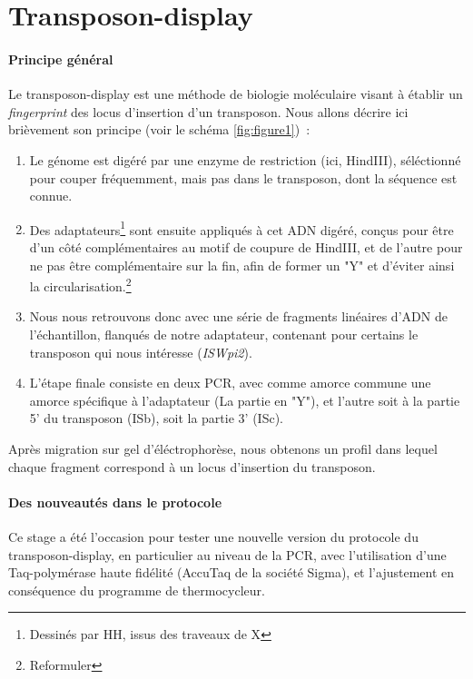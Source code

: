 \section{Transposon-display} %
\label{sec:transposon_display}

	\paragraph{Principe général} %
	\label{par:principe_TnDisp}
	Le transposon-display est une méthode de biologie moléculaire visant à établir un \textit{fingerprint} des locus d’insertion d’un transposon. Nous allons décrire ici brièvement son principe (voir le schéma \ref{fig:figure1})~:
	\begin{enumerate}
		\item Le génome est digéré par une enzyme de restriction (ici, HindIII), séléctionné pour couper fréquemment, mais pas dans le transposon, dont la séquence est connue.
		\item Des adaptateurs\footnote{Dessinés par HH, issus des traveaux de X} sont ensuite appliqués à cet ADN digéré, conçus pour être d’un côté complémentaires au motif de coupure de HindIII, et de l’autre pour ne pas être complémentaire sur la fin, afin de former un "Y" et d’éviter ainsi la circularisation.\footnote{Reformuler}
		\item Nous nous retrouvons donc avec une série de fragments linéaires d’ADN de l’échantillon, flanqués de notre adaptateur, contenant pour certains le transposon qui nous intéresse (\textit{ISWpi2}).
		\item L’étape finale consiste en deux PCR, avec comme amorce commune une amorce spécifique à l’adaptateur (La partie en "Y"), et l’autre soit à la partie 5’ du transposon (ISb), soit la partie 3’ (ISc).
	\end{enumerate}
	Après migration sur gel d’éléctrophorèse, nous obtenons un profil dans lequel chaque fragment correspond à un locus d’insertion du transposon.

	\paragraph{Des nouveautés dans le protocole} %
	\label{par:protocole2}
	Ce stage a été l’occasion pour tester une nouvelle version du protocole du transposon-display, en particulier au niveau de la PCR, avec l’utilisation d’une Taq-polymérase haute fidélité (AccuTaq de la société Sigma), et l’ajustement en conséquence du programme de thermocycleur.

